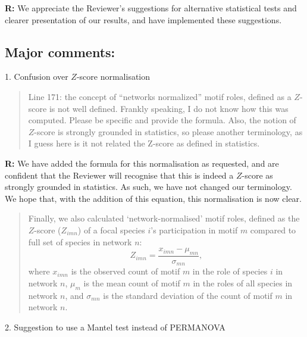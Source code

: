 \documentclass[12pt]{article}
\begin{document}
  \textbf{R:} We appreciate the Reviewer's suggestions for alternative statistical tests and clearer presentation of our results, and have implemented these suggestions.

  \smallskip

  \subsection*{Major comments:}

    1. Confusion over $Z$-score normalisation

      \begin{quotation}
        Line 171: the concept of ``networks normalized'' motif roles, defined as a $Z$-score is not well defined. Frankly speaking, I do not know how this was computed. Please be specific and provide the formula. Also, the notion of $Z$-score is strongly grounded in statistics, so please another terminology, as I guess here is it not related the Z-score as defined in statistics.
      \end{quotation}

      \smallskip

      \textbf{R:} We have added the formula for this normalisation as requested, and are confident that the Reviewer will recognise that this is indeed a $Z$-score as strongly grounded in statistics. As such, we have not changed our terminology. We hope that, with the addition of this equation, this normalisation is now clear.

      \begin{quotation}
        Finally, we also calculated `network-normalised' motif roles, defined as the $Z$-score ($Z_{imn}$) of a focal species $i$'s participation in motif $m$ compared to full set of species in network $n$:
        \begin{equation}
                Z_{imn} = \frac{x_{imn}-\mu_{mn}}{\sigma_{mn}} ,
        \end{equation}
        where $x_{imn}$ is the observed count of motif $m$ in the role of species $i$ in network $n$, $\mu_m$ is the mean count of motif $m$ in the roles of all species in network $n$, and $\sigma_{mn}$ is the standard deviation of the count of motif $m$ in network $n$.
      \end{quotation}

    \smallskip

    2. Suggestion to use a Mantel test instead of PERMANOVA
\end{document}
